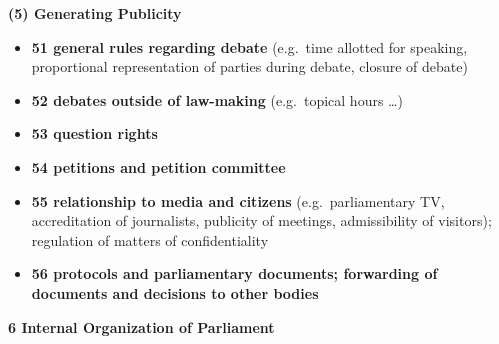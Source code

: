 \documentclass[10pt,]{article}
\providecommand{\tightlist}{%
  \setlength{\itemsep}{0pt}\setlength{\parskip}{0pt}}
\begin{document}
\textbf{(5) Generating Publicity}

\begin{itemize}
\tightlist
\item
  \textbf{51 general rules regarding debate} (e.g.~time allotted for
  speaking, proportional representation of parties during debate,
  closure of debate)
\item
  \textbf{52 debates outside of law-making} (e.g.~topical hours
  \ldots{})
\item
  \textbf{53 question rights}
\item
  \textbf{54 petitions and petition committee}
\item
  \textbf{55 relationship to media and citizens} (e.g.~parliamentary TV,
  accreditation of journalists, publicity of meetings, admissibility of
  visitors); regulation of matters of confidentiality
\item
  \textbf{56 protocols and parliamentary documents; forwarding of
  documents and decisions to other bodies}
\end{itemize}

\textbf{6 Internal Organization of Parliament}
\end{document}
